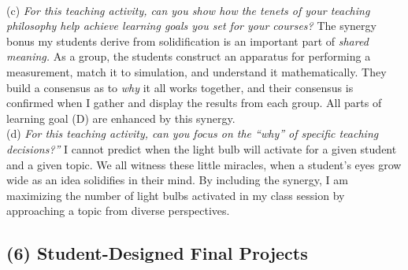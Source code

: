\documentclass[../../../main.tex]{subfiles}
\begin{document}
\\
\vspace{0.15cm}
(c) \textit{For this teaching activity, can you show how the tenets of your teaching philosophy help achieve learning goals you set for your courses?}  The synergy bonus my students derive from solidification is an important part of \textit{shared meaning.}  As a group, the students construct an apparatus for performing a measurement, match it to simulation, and understand it mathematically.  They build a consensus as to \textit{why} it all works together, and their consensus is confirmed when I gather and display the results from each group.  All parts of learning goal (D) are enhanced by this synergy.
\\
\vspace{0.15cm}
(d) \textit{For this teaching activity, can you focus on the ``why'' of specific teaching decisions?''} I cannot predict when the light bulb will activate for a given student and a given topic.  We all witness these little miracles, when a student's eyes grow wide as an idea solidifies in their mind.  By including the synergy, I am maximizing the number of light bulbs activated in my class session by approaching a topic from diverse perspectives.

\subsection{(6) Student-Designed Final Projects}
\end{document}
